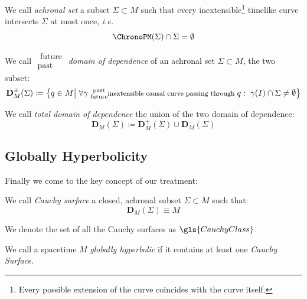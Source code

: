 \documentclass[Main]{subfiles}
\begin{document}
			\begin{definition}
				We call \emph{achronal set} a subset $\Sigma \subset M$ such that every inextensible\footnote{Every possible extension of the curve coincides with the curve itself.}
				 timelike curve intersects $\Sigma$ at most once, \textit{i.e.}
				 \begin{displaymath}
				 	\ChronoPM ( \Sigma) \cap \Sigma = \emptyset
				 \end{displaymath}
			\end{definition}

			\begin{definition}
				We call \emph{$\substack{\textrm{ future}\\ \textrm{past } } $ domain of dependence} of an achronal set  $\Sigma \subset M$, the two subset:
				\begin{displaymath}
					\mathbf{D}_M^\pm(\Sigma) \coloneqq \big\{ q \in M \big\vert \; \forall \gamma \substack{\textrm{ past}\\ \textrm{ future} }\textrm{\footnotesize inextensible causal curve passing through }q : \; \gamma(I) \cap \Sigma \neq \emptyset  \big\}
				\end{displaymath}
			\end{definition}
			We call \emph{total domain of dependence} the union of the two domain of dependence:
			$$\mathbf{D}_M(\Sigma)  \coloneqq \mathbf{D}_M^+(\Sigma) \cup \mathbf{D}_M^-(\Sigma)$$

		\subsection{Globally Hyperbolicity}
			Finally we come to the key concept of our treatment:

			\begin{definition}
				We call \emph{Cauchy surface} a closed, achronal subset $\Sigma \subset M$ such that:
				\begin{displaymath}
					\mathbf{D}_M(\Sigma) \equiv M
				\end{displaymath}
			\end{definition}
				We denote the set of all the Cauchy surfaces as $\gls{CauchyClass}$.
		\begin{definition}\label{Def:GHSP}
			We call a spacetime $M$ \emph{globally hyperbolic} if it contains at least one \emph{Cauchy Surface}.
		\end{definition}
\end{document}
